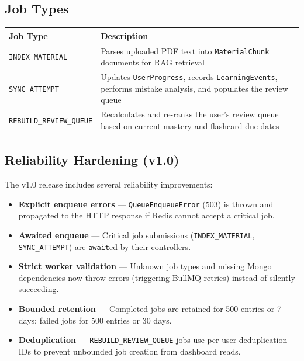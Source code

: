 \documentclass[12pt,a4paper]{article}
\begin{document}
\subsection{Job Types}

\begin{longtable}{p{5cm} p{9cm}}
\toprule
\textbf{Job Type} & \textbf{Description} \\
\midrule
\texttt{INDEX\_MATERIAL} & Parses uploaded PDF text into \texttt{MaterialChunk} documents for RAG retrieval \\
\texttt{SYNC\_ATTEMPT} & Updates \texttt{UserProgress}, records \texttt{LearningEvents}, performs mistake analysis, and populates the review queue \\
\texttt{REBUILD\_REVIEW\_QUEUE} & Recalculates and re-ranks the user's review queue based on current mastery and flashcard due dates \\
\bottomrule
\end{longtable}

\subsection{Reliability Hardening (v1.0)}
The v1.0 release includes several reliability improvements:
\begin{itemize}[leftmargin=1.5cm]
    \item \textbf{Explicit enqueue errors} --- \texttt{QueueEnqueueError} (503) is thrown and propagated to the HTTP response if Redis cannot accept a critical job.
    \item \textbf{Awaited enqueue} --- Critical job submissions (\texttt{INDEX\_MATERIAL}, \texttt{SYNC\_ATTEMPT}) are \texttt{await}ed by their controllers.
    \item \textbf{Strict worker validation} --- Unknown job types and missing Mongo dependencies now throw errors (triggering BullMQ retries) instead of silently succeeding.
    \item \textbf{Bounded retention} --- Completed jobs are retained for 500 entries or 7 days; failed jobs for 500 entries or 30 days.
    \item \textbf{Deduplication} --- \texttt{REBUILD\_REVIEW\_QUEUE} jobs use per-user deduplication IDs to prevent unbounded job creation from dashboard reads.
\end{itemize}

\end{document}
